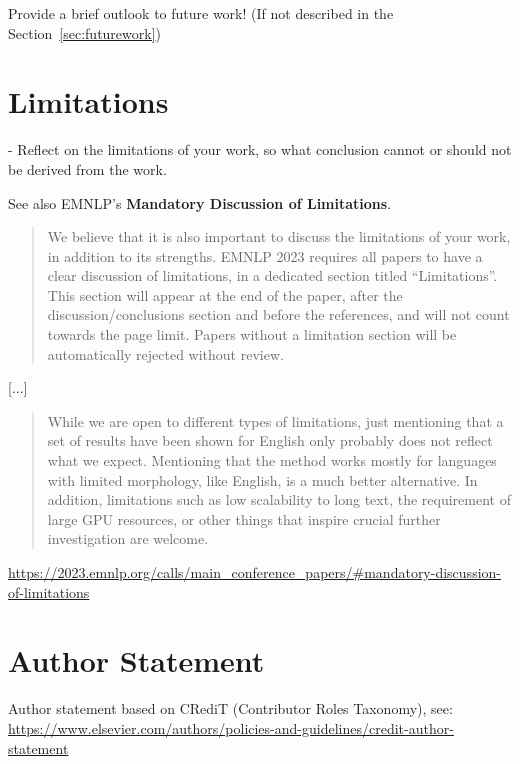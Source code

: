 \documentclass[sigconf, nonacm]{acmart}
\begin{document}

Provide a brief outlook to future work! (If not described in the Section~\ref{sec:futurework})


\section*{Limitations}

- Reflect on the limitations of your work, so what conclusion cannot or should not be derived from the work.

See also EMNLP's \textbf{Mandatory Discussion of Limitations}.

\begin{quote}
    We believe that it is also important to discuss the limitations of your work, in addition to its strengths. EMNLP 2023 requires all papers to have a clear discussion of limitations, in a dedicated section titled “Limitations”. This section will appear at the end of the paper, after the discussion/conclusions section and before the references, and will not count towards the page limit. Papers without a limitation section will be automatically rejected without review.
\end{quote}

[...]

\begin{quote}
While we are open to different types of limitations, just mentioning that a set of results have been shown for English only probably does not reflect what we expect. Mentioning that the method works mostly for languages with limited morphology, like English, is a much better alternative. In addition, limitations such as low scalability to long text, the requirement of large GPU resources, or other things that inspire crucial further investigation are welcome.
\end{quote}

\url{https://2023.emnlp.org/calls/main_conference_papers/#mandatory-discussion-of-limitations}


\section*{Author Statement}


Author statement based on CRediT (Contributor Roles Taxonomy), see: \url{https://www.elsevier.com/authors/policies-and-guidelines/credit-author-statement}
\end{document}
